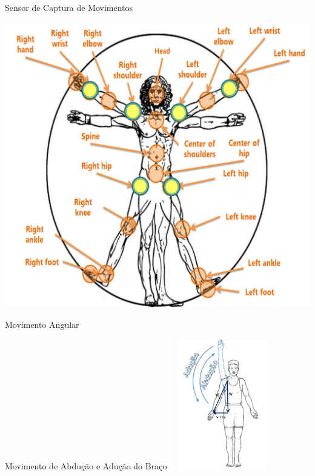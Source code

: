 \documentclass{beamer}
\begin{document}
\begin{frame}{Sensor de Captura de Movimentos}
  \begin{block}{}
      \center \includegraphics[height=2.5 in]{img/articulacoes-sel.png}
  \end{block}
\end{frame}

\begin{frame}{Movimento Angular}
  \begin{block}{Movimento de Abdução e Adução do Braço ~\cite{mcginnis2013biomechanics}}
      \center \includegraphics[width=4cm]{img/abducao-angulo.png}
  \end{block}
\end{frame}


% 
% 
% 
\end{document}
